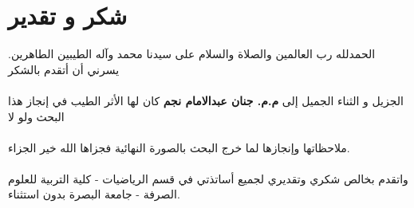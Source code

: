 \chapter*{شكر و تقدير}

الحمدلله رب العالمين والصلاة والسلام على سيدنا محمد وآله الطيبين الطاهرين. يسرني أن أتقدم بالشكر\\ \\ الجزيل و الثناء الجميل إلى \textbf{م.م. جنان عبدالامام نجم} كان لها الأثر الطيب في إنجاز هذا البحث ولو لا\\ \\ ملاحظاتها وإنجازها لما خرج البحث بالصورة النهائية فجزاها الله خير الجزاء.\\
\\
واتقدم بخالص شكري وتقديري لجميع أساتذتي في قسم الرياضيات - كلية التربية للعلوم الصرفة - جامعة البصرة بدون استثناء.
